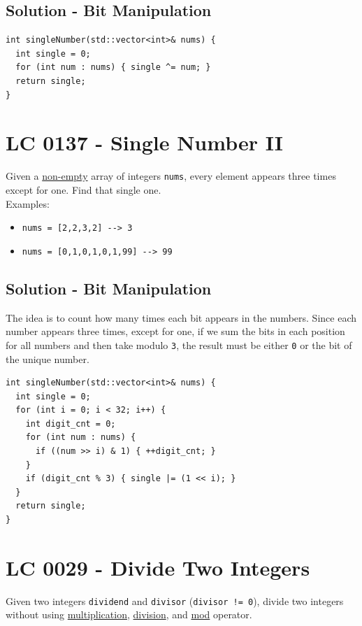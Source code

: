 \subsection*{Solution - Bit Manipulation}
\begin{lstlisting}
int singleNumber(std::vector<int>& nums) {
  int single = 0;
  for (int num : nums) { single ^= num; }
  return single;
}
\end{lstlisting}

\section{LC 0137 - Single Number II}
Given a \ul{non-empty} array of integers {\colorbox{CodeBackground}{\lstinline|nums|}}, every element appears three times except for one. Find that single one.\\

Examples:
\begin{itemize}
\item {\colorbox{CodeBackground}{\lstinline|nums = [2,2,3,2] --> 3|}}
\item {\colorbox{CodeBackground}{\lstinline|nums = [0,1,0,1,0,1,99] --> 99|}}
\end{itemize}

\subsection*{Solution - Bit Manipulation}
The idea is to count how many times each bit appears in the numbers. Since each number appears three times, except for one, if we sum the bits in each position for all numbers and then take modulo {\colorbox{CodeBackground}{\lstinline|3|}}, the result must be either {\colorbox{CodeBackground}{\lstinline|0|}} or the bit of the unique number.
\begin{lstlisting}
int singleNumber(std::vector<int>& nums) {
  int single = 0;
  for (int i = 0; i < 32; i++) {
    int digit_cnt = 0;
    for (int num : nums) {
      if ((num >> i) & 1) { ++digit_cnt; }
    }
    if (digit_cnt % 3) { single |= (1 << i); }
  }
  return single;
}
\end{lstlisting}

\section{LC 0029 - Divide Two Integers}
Given two integers {\colorbox{CodeBackground}{\lstinline|dividend|}} and {\colorbox{CodeBackground}{\lstinline|divisor|}} ({\colorbox{CodeBackground}{\lstinline|divisor != 0|}}), divide two integers without using \ul{multiplication}, \ul{division}, and \ul{mod} operator.\\

